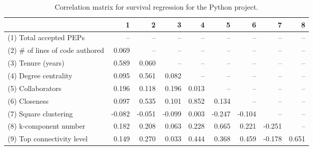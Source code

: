 \begin{table}[H]
\caption{Correlation matrix for survival regression for the Python project.}
\label{corr_table_survival}
\begin{center}
\begin{tabular}{lrrrrrrrr}
\toprule
{} &      1 &      2 &      3 &     4 &      5 &      6 &      7 &     8 \\
\midrule
(1) Total accepted PEPs         &    -- &    -- &    -- &   -- &    -- &    -- &    -- &   -- \\
(2) \# of lines of code authored &  0.069 &    -- &    -- &   -- &    -- &    -- &    -- &   -- \\
(3) Tenure (years)              &  0.589 &  0.060 &    -- &   -- &    -- &    -- &    -- &   -- \\
(4) Degree centrality           &  0.095 &  0.561 &  0.082 &   -- &    -- &    -- &    -- &   -- \\
(5) Collaborators               &  0.196 &  0.118 &  0.196 & 0.013 &    -- &    -- &    -- &   -- \\
(6) Closeness                   &  0.097 &  0.535 &  0.101 & 0.852 &  0.134 &    -- &    -- &   -- \\
(7) Square clustering           & -0.082 & -0.051 & -0.099 & 0.003 & -0.247 & -0.104 &    -- &   -- \\
(8) k-component number          &  0.182 &  0.208 &  0.063 & 0.228 &  0.665 &  0.221 & -0.251 &   -- \\
(9) Top connectivity level      &  0.149 &  0.270 &  0.033 & 0.444 &  0.368 &  0.459 & -0.178 & 0.651 \\
\bottomrule
\end{tabular}
\end{center} 
\end{table}
